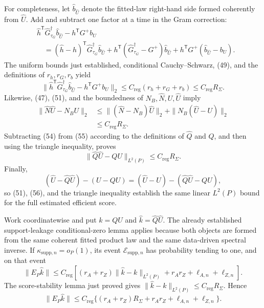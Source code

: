 For completeness, let \(\widehat b_{\widehat U}\) denote the fitted-law right-hand side formed coherently from \(\widehat U\).  Add and subtract one factor at a time in the Gram correction:
\[
\begin{aligned}
 &\widehat h^{\mathsf T}\widehat G_{\tau_G}^{\dagger}
       \widehat b_{\widehat U}-h^{\mathsf T}G^+b_U\\
 &\quad=(\widehat h-h)^{\mathsf T}\widehat G_{\tau_G}^{\dagger}
              \widehat b_{\widehat U}
 +h^{\mathsf T}(\widehat G_{\tau_G}^{\dagger}-G^+)
              \widehat b_{\widehat U}
 +h^{\mathsf T}G^+(\widehat b_{\widehat U}-b_U).
\end{aligned}
\tag{53}
\]
The uniform bounds just established, conditional Cauchy--Schwarz, (49), and the definitions of \(r_h,r_G,r_b\) yield
\[
 \|\widehat h^{\mathsf T}\widehat G_{\tau_G}^{\dagger}
       \widehat b_{\widehat U}-h^{\mathsf T}G^+b_U\|_2
 \leq C_{\mathrm{reg}}(r_h+r_G+r_b)
 \leq C_{\mathrm{reg}}R_\Sigma.
 \tag{54}
\]
Likewise, (47), (51), and the boundedness of \(N_B,\widehat N,U,\widehat U\) imply
\[
\begin{aligned}
 \|\widehat N\widehat U-N_BU\|_2
 &\leq\|(\widehat N-N_B)\widehat U\|_2
       +\|N_B(\widehat U-U)\|_2\\
 &\leq C_{\mathrm{reg}}R_\Sigma.
\end{aligned}
\tag{55}
\]
Subtracting (54) from (55) according to the definitions of \(\widehat Q\) and \(Q\), and then using the triangle inequality, proves
\[
 \|\widehat Q\widehat U-QU\|_{L^2(P)}
 \leq C_{\mathrm{reg}}R_\Sigma.
 \tag{56}
\]
Finally,
\[
 (\widehat U-\widehat Q\widehat U)-(U-QU)
 =(\widehat U-U)-(\widehat Q\widehat U-QU),
\]
so (51), (56), and the triangle inequality establish the same linear \(L^2(P)\) bound for the full estimated efficient score.

Work coordinatewise and put \(k=QU\) and \(\widehat k=\widehat Q\widehat U\).  The already established support-leakage conditional-zero lemma applies because both objects are formed from the same coherent fitted product law and the same data-driven spectral inverse.  If \(\kappa_{\mathrm{supp},n}=o_P(1)\), its event \(\mathcal E_{\mathrm{supp},n}\) has probability tending to one, and on that event
\[
 \|E_P\widehat k\|
 \leq C_{\mathrm{reg}}\left[
 (r_A+r_Z)\|\widehat k-k\|_{L^2(P)}+r_Ar_Z
 +\ell_{A,n}+\ell_{Z,n}\right].
 \tag{57}
\]
The score-stability lemma just proved gives
\(\|\widehat k-k\|_{L^2(P)}\leq C_{\mathrm{reg}}R_\Sigma\).  Hence
\[
 \|E_P\widehat k\|
 \leq C_{\mathrm{reg}}
 \{(r_A+r_Z)R_\Sigma+r_Ar_Z
   +\ell_{A,n}+\ell_{Z,n}\}.
 \tag{58}
\]

